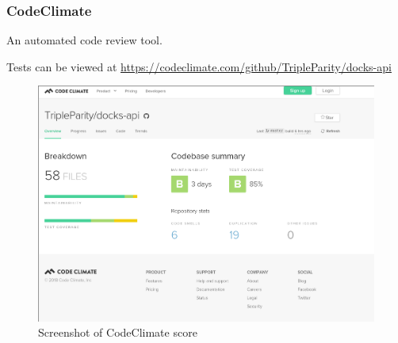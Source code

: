 \documentclass[]{article}
\begin{document}
\pagebreak

\subsubsection{CodeClimate}
An automated code review tool.

Tests can be viewed at \url{https://codeclimate.com/github/TripleParity/docks-api}
\begin{figure}[H]
	\centering
	\includegraphics[scale=0.4]{codeclimate_api.png}
	\caption{Screenshot of CodeClimate score}
\end{figure}
\end{document}
